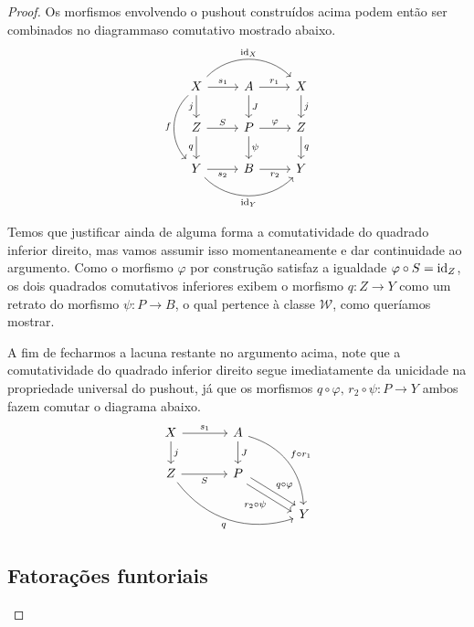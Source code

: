 \begin{proof}
  Os morfismos envolvendo o pushout construídos acima podem então ser combinados no diagrammaso comutativo mostrado abaixo.
  \begin{displaymath}
    \begin{tikzcd}
      X
      \arrow[r, "s_{1}"]
      \arrow[d, "j" swap]
      \arrow[rr, bend left=45, "\id_{X}"]
      \arrow[dd, bend right=45, "f" swap]
      & A
      \arrow[d, "J"]
      \arrow[r, "r_{1}"]
      & X
      \arrow[d, "j"]
      \\ Z
      \arrow[r, "S"]
      \arrow[d, "q" swap]
      & P
      \arrow[d, "\psi"]
      \arrow[r, "\varphi"]
      & Z
      \arrow[d, "q"]
      \\ Y
      \arrow[r, "s_{2}" swap]
      \arrow[rr, bend right=45, "\id_{Y}" swap]
      & B
      \arrow[r, "r_{2}" swap]
      & Y
    \end{tikzcd}
  \end{displaymath}
  
  Temos que justificar ainda de alguma forma a comutatividade do quadrado inferior direito, mas vamos assumir isso momentaneamente e dar continuidade ao argumento.
  Como o morfismo $\varphi$ por construção satisfaz a igualdade $\varphi \circ S = \mathrm{id}_{Z}$, os dois quadrados comutativos inferiores exibem o morfismo $q: Z \to Y$ como um retrato do morfismo $\psi: P \to B$, o qual pertence à classe $\mathcal{W}$, como queríamos mostrar.  

  A fim de fecharmos a lacuna restante no argumento acima, note que a comutatividade do quadrado inferior direito segue imediatamente da unicidade na propriedade universal do pushout, já que os morfismos $q \circ \varphi,\, r_{2} \circ \psi: P \to Y$ ambos fazem comutar o diagrama abaixo.
  \begin{displaymath}
    \begin{tikzcd}[column sep=1.25cm]
       X
      \arrow[r, "s_{1}"]
      \arrow[d, "j"]
      & A
      \arrow[d, "J"]
      \arrow[rdd, bend left=35, "f \circ r_{1}"]
      \\ Z
      \arrow[r, "S" swap]
      \arrow[rrd, bend right=35, "q" swap]
      & P
      \arrow[rd, shift left=1.2, "q \circ \varphi"]
      \arrow[rd, shift right=1.2, "r_{2} \circ \psi" swap]
      \\ & & Y
    \end{tikzcd} \qedhere
  \end{displaymath}

  \subsection{Fatorações funtoriais}


\end{proof}
